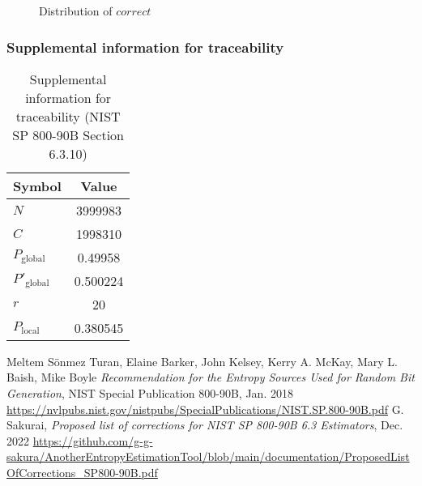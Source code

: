 \documentclass[a3paper,xelatex,english]{bxjsarticle}
\begin{document}
\begin{figure}[htbp]
\centering

\caption{Distribution of $correct$}
\end{figure}
\subsubsection{Supplemental information for traceability}
\renewcommand{\arraystretch}{1.8}
\begin{table}[h]
\caption{Supplemental information for traceability (NIST SP 800-90B Section 6.3.10)}
\begin{center}
\begin{tabular}{|l|c|}
\hline 
\rowcolor{anotherlightblue} %
Symbol				& Value \\ \hline 
$N$				& 3999983\\ \hline 
$C$				& 1998310\\ \hline 
$P_{\textrm{global}}$				&  0.49958\\ \hline 
$P'_{\textrm{global}}$			& 0.500224\\ \hline 
$r$				& 20\\ \hline 
$P_{\textrm{local}}$ 			& 0.380545\\ \hline
\end{tabular}
\end{center}
\end{table}
\renewcommand{\arraystretch}{1.4}
\begin{thebibliography}{99}
Meltem S\"{o}nmez Turan,
Elaine Barker,
John Kelsey,
Kerry A. McKay,
Mary L. Baish,
Mike Boyle
\textit{Recommendation for the Entropy Sources Used for Random Bit Generation},
NIST Special Publication 800-90B, Jan. 2018 
\url{https://nvlpubs.nist.gov/nistpubs/SpecialPublications/NIST.SP.800-90B.pdf}
G. Sakurai, \textit{Proposed list of corrections for NIST SP 800-90B 6.3 Estimators}, Dec. 2022 
\url{https://github.com/g-g-sakura/AnotherEntropyEstimationTool/blob/main/documentation/ProposedListOfCorrections_SP800-90B.pdf}
\end{thebibliography}
\end{document}
